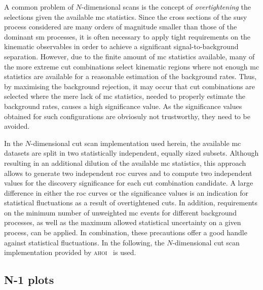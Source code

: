 A common problem of $N$-dimensional scans is the concept of \textit{overtightening} the selections given the available \gls{mc} statistics.
Since the cross sections of the \gls{susy} process considered are many orders of magnitude smaller than those of the dominant \gls{sm} processes, it is often necessary to apply tight requirements on the kinematic observables in order to achieve a significant signal-to-background separation.
However, due to the finite amount of \gls{mc} statistics available, many of the more extreme cut combinations select kinematic regions where not enough \gls{mc} statistics are available for a reasonable estimation of the background rates.
Thus, by maximising the background rejection, it may occur that cut combinations are selected where the mere lack of \gls{mc} statistics, needed to properly estimate the background rates, causes a high significance value.
As the significance values obtained for such configurations are obviosuly not trustworthy, they need to be avoided. 

In the $N$-dimensional cut scan implementation used herein, the available \gls{mc} datasets are split in two statistically independent, equally sized subsets. Although resulting in an additional dilution of the available \gls{mc} statistics, this approach allows to generate two independent \gls{roc} curves and  to compute two independent values for the discovery significance for each cut combination candidate. A large difference in either the \gls{roc} curves or the significance values is an indication for statistical fluctuations as a result of overtightened cuts. In addition, requirements on the minimum number of unweighted \gls{mc} events for different background processes, as well as the maximum allowed statistical uncertainty on a given process, can be applied. In combination, these precautions offer a good handle against statistical fluctuations. In the following, the $N$-dimensional cut scan implementation provided by \textsc{ahoi}~\cite{ahoi} is used.

\subsection{N-1 plots}\label{sec:n-1-scan}

